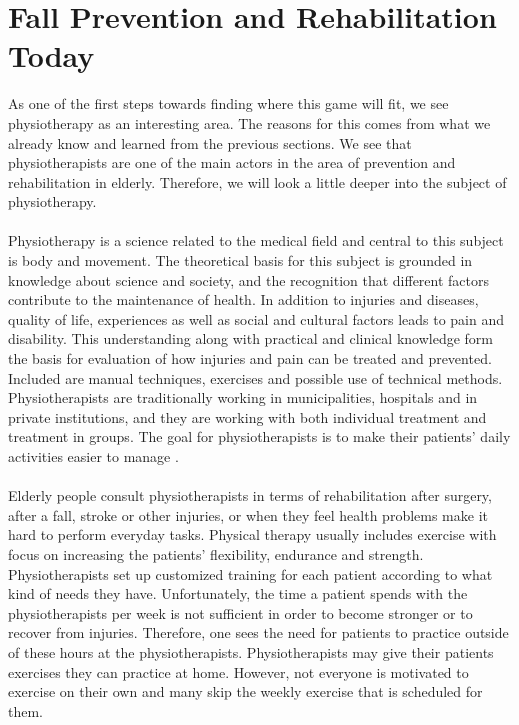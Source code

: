 \section{Fall Prevention and Rehabilitation Today}
As one of the first steps towards finding where this game will fit, we see physiotherapy as an interesting area. The reasons for this comes from what we already know and learned from the previous sections. We see that physiotherapists are one of the main actors in the area of prevention and rehabilitation in elderly. Therefore, we will look a little deeper into the subject of physiotherapy. \\ \\
Physiotherapy is a science related to the medical field and central to this subject is body and movement. The theoretical basis for this subject is grounded in knowledge about science and society, and the recognition that different factors contribute to the maintenance of health. In addition to injuries and diseases, quality of life, experiences as well as social and cultural factors leads to pain and disability. This understanding along with practical and clinical knowledge form the basis for evaluation of how injuries and pain can be treated and prevented. Included are manual techniques, exercises and possible use of technical methods. Physiotherapists are traditionally working in municipalities, hospitals and in private institutions, and they are working with both individual treatment and treatment in groups. The goal for physiotherapists is to make their patients' daily activities easier to manage \cite{physiotherapy1}\cite{physiotherapy2}.\\ \\
Elderly people consult physiotherapists in terms of rehabilitation after surgery, after a fall, stroke or other injuries, or when they feel health problems make it hard to perform everyday tasks. Physical therapy usually includes exercise with focus on increasing the patients’ flexibility, endurance and strength. Physiotherapists set up customized training for each patient according to what kind of needs they have. Unfortunately, the time a patient spends with the physiotherapists per week is not sufficient in order to become stronger or to recover from injuries. Therefore, one sees the need for patients to practice outside of these hours at the physiotherapists. Physiotherapists may give their patients exercises they can practice at home. However, not everyone is motivated to exercise on their own and many skip the weekly exercise that is scheduled for them. \cite{physiotherapy2} 


